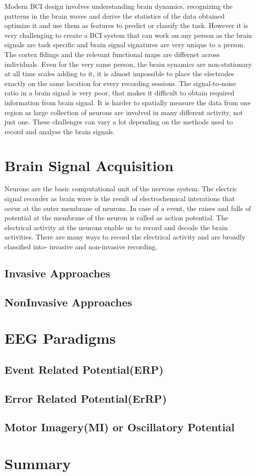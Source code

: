 Modern BCI design involves understanding brain dynamics, recognizing the patterns in the brain waves and derive the statistics of the data obtained
optimize it and use them as features to predict or classify the task. However it is very challenging to create a BCI system that can work on any person
as the brain signals are task specific and brain signal signatures are very unique to a person. The cortex fldings and the relevant functional maps are
differnet across individuals. Even for the very same person, the brain synamics are non-stationary at all time scales adding to it, it is almost impossible 
to place the electrodes exactly on the same location for every recording sessions. The signal-to-noise ratio in a brain signal is very poor, that makes it
difficult to obtain required information from brain signal. It is harder to spatially measure the data from one region as large collection of neurons
are involved in many different activity, not just one. These challenges can vary a lot depending on the methods used to record and analyse the brain signals.


\section{Brain Signal Acquisition}
Neurons are the basic computational unit of the nervous system. The electric signal recorder as brain wave is the result of electrochemical interations
that occur at the outer membrane of neurons. In case of a event, the raises and falls of potential at the membrane of the neuron is called as action potential.
The electrical activity at the neurons enable us to record and decode the brain activities. There are many ways to record the electrical activity and 
are broadly classified into- invasive and non-invasive recording.

    \subsection{Invasive Approaches}

    \subsection{NonInvasive Approaches}

\section{EEG Paradigms}

    \subsection{Event Related Potential(ERP)}

    \subsection{Error Related Potential(ErRP)}

    \subsection{Motor Imagery(MI) or Oscillatory Potential}


\section*{Summary} 